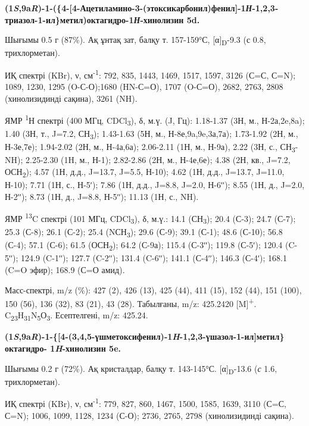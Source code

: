 \textbf{(1\emph{S},9a\emph{R})-1-(\{4-{[}4-Ацетиламино-3-(этоксикарбонил)фенил{]}-1\emph{Н}-1,2,3-триазол-1-ил\}метил)октагидро-1\emph{Н}-хинолизин
5d.}

Шығымы 0.5 г (87\%). Ақ ұнтақ зат, балқу т. 157-159°С,
{[}α{]}\textsubscript{D}-9.3 (с 0.8, трихлорметан).

ИҚ спектрі (KBr), ν, см\textsuperscript{-1}: 792, 835, 1443, 1469, 1517,
1597, 3126 (С=С, С=N); 1089, 1230, 1295 (O-С-О);1680 (HN-С=О), 1707
(O-С=О), 2682, 2763, 2808 (хинолизидинді сақина), 3261 (NH).

ЯМР \textsuperscript{1}Н спектрі (400 МГц, CDCl\textsubscript{3}), δ,
м.ү. (J, Гц): 1.18-1.37 (3Н, м., Н-2а,2e,8a); 1.40 (3Н, т., J=7.2,
СН\textsubscript{3}); 1.43-1.63 (5Н, м., Н-8е,9a,9e,3а,7а); 1.73-1.92
(2Н, м., Н-3е,7е); 1.94-2.02 (2Н, м., Н-4а,6а); 2.06-2.11 (1Н, м.,
Н-9а), 2.22 (3Н, с., СН\textsubscript{3}-NH); 2.25-2.30 (1H, м., Н-1);
2.82-2.86 (2Н, м., Н-4е,6е); 4.38 (2Н, кв., J=7.2,
ОСН\textsubscript{2}); 4.57 (1Н, д.д., J=13.7, J=5.5, Н-10); 4.62 (1Н,
д.д., J=13.7, J=11.0, Н-10); 7.71 (1Н, с., Н-5ʹ); 7.86 (1Н, д.д., J=8.8,
J=2.0, Н-6ʹʹ); 8.55 (1Н, д., J=2.0, Н-2ʹʹ); 8.73 (1Н, д., J=8.8, Н-5ʹʹ);
11.13 (1Н, с., NH).

ЯМР \textsuperscript{13}C спектрі (101 МГц, CDCl\textsubscript{3}), δ,
м.ү.: 14.1 (СН\textsubscript{3}); 20.4 (С-3); 24.7 (С-7); 25.3 (С-8);
26.1 (С-2); 25.4 (NСН\textsubscript{3}); 29.6 (С-9); 39.1 (С-1); 48.6
(С-10); 56.8 (С-4); 57.1 (С-6); 61.5 (ОСН\textsubscript{2}); 64.2
(С-9а); 115.4 (С-3ʹʹ); 119.8 (С-5ʹ); 120.4 (C-5ʹʹ); 124.9 (C-1ʹʹ); 127.7
(C-2ʹʹ); 131.4 (C-6ʹʹ); 141.1 (С-4ʹʹ); 146.3 (С-4ʹ); 168.1 (C=O эфир);
168.9 (С=О амид).

Масс-спектрі, m/z (\%): 427 (2), 426 (13), 425 (44), 411 (15), 152 (44),
151 (100), 150 (56), 136 (32), 83 (21), 43 (28). Табылғаны, m/z:
425.2420 {[}M{]}\textsuperscript{+}.
C\textsubscript{23}H\textsubscript{31}N\textsubscript{5}О\textsubscript{3}.
Есептелгені, m/z: 425.24.

\textbf{(1\emph{S},9a\emph{R})-1-\{{[}4-(3,4,5-үшметоксифенил)-1\emph{H}-1,2,3-үшазол-1-ил{]}метил\}октагидро-
1\emph{H}-хинолизин 5e.}

Шығымы 0.2 г (72\%). Ақ кристалдар, балқу т. 143-145°С.
{[}α{]}\textsubscript{D}-13.6 (\emph{с} 1.6, трихлорметан).

ИҚ спектрі (KBr), ν, см\textsuperscript{-1}: 779, 827, 860, 1467, 1500,
1585, 1639, 3110 (С=С, С=N); 1006, 1099, 1128, 1234 (С-О); 2736, 2765,
2798 (хинолизидинді сақина).

